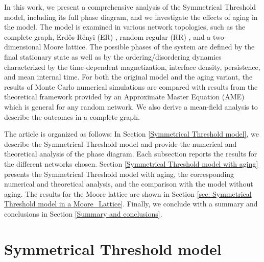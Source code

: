 In this work, we present a comprehensive analysis of the Symmetrical Threshold model, including its full phase diagram, and we investigate the effects of aging in the model. The model is examined in various network topologies, such as the complete graph, Erd\H{o}s-Rényi (ER)  \cite{erdos1960evolution}, random regular (RR) \cite{wormald1999models}, and a two-dimensional Moore lattice. The possible phases of the system are defined by the final stationary state as well as by the ordering/disordering dynamics characterized by the time-dependent magnetization, interface density, persistence, and mean internal time. For both the original model and the aging variant, the results of Monte Carlo numerical simulations are compared with results from the theoretical framework provided by an Approximate Master Equation (AME)\cite{gleeson-2013,Abella-2022-AME} %
which is general for any random network. We also derive a mean-field analysis to describe the outcomes in a complete graph.
	
The article is organized as follows: In Section \ref{Symmetrical Threshold model}, we describe the Symmetrical Threshold model and provide the numerical and theoretical analysis of the phase diagram. Each subsection reports the results for the different networks chosen. Section \ref{Symmetrical Threshold model with aging} presents the Symmetrical Threshold model with aging, the corresponding numerical and theoretical analysis, and the comparison with the model without aging. The results for the Moore lattice are shown in Section \ref{sec: Symmetrical Threshold model in a Moore_Lattice}. Finally, we conclude with a summary and conclusions in Section \ref{Summary and conclusions}.
	
	\section{\label{Symmetrical Threshold model} Symmetrical Threshold model}
	
